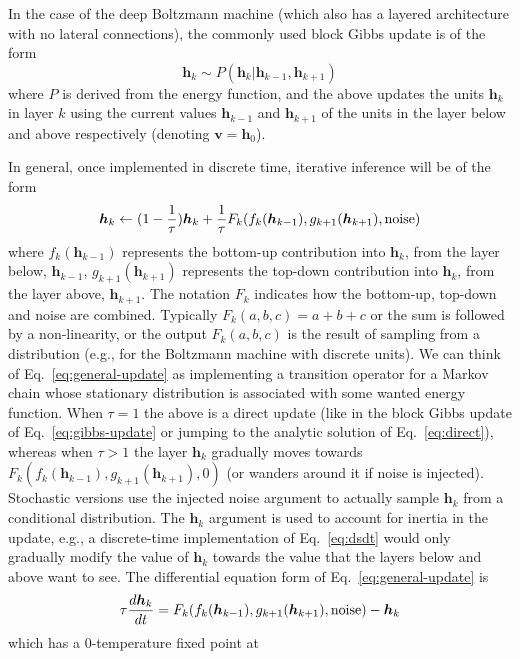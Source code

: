 \documentclass{article}
\newcommand   \vv{{\bm v}}
\newcommand   \vh{{\bm h}}
\begin{document}
In the case of the deep Boltzmann machine (which also has a layered architecture
with no lateral connections), the commonly used block Gibbs update is of the form
\begin{equation}
  \label{eq:gibbs-update}
  \vh_k \sim P(\vh_k | \vh_{k-1}, \vh_{k+1})
\end{equation}
where $P$ is derived from the energy function, and the above
updates the units $\vh_k$ in layer $k$ using the current values $\vh_{k-1}$ and $\vh_{k+1}$ of the
units in the layer below and above respectively (denoting $\vv=\vh_0$).

In general, once implemented in discrete time, iterative inference will be of the form
\begin{equation}
  \label{eq:general-update}
  \vh_k \leftarrow (1-\frac{1}{\tau}) \vh_k + \frac{1}{\tau} F_k(f_k(\vh_{k-1}),g_{k+1}(\vh_{k+1}),{\rm noise})
\end{equation}
where $f_k(\vh_{k-1})$ represents the bottom-up contribution into $\vh_k$, from the layer below, $\vh_{k-1}$,
$g_{k+1}(\vh_{k+1})$ represents the top-down contribution into $\vh_k$, from the layer above, $\vh_{k+1}$.
The notation $F_k$ indicates how the bottom-up, top-down and noise are combined. Typically $F_k(a,b,c)=a+b+c$
or the sum is followed by a non-linearity, or the output $F_k(a,b,c)$ is the result of sampling from a distribution
(e.g., for the Boltzmann machine with discrete units).
We can think of Eq.~\ref{eq:general-update} as implementing a transition operator for
a Markov chain whose stationary distribution is associated with some wanted energy function.
When $\tau=1$ the above is a direct update (like in the block Gibbs update of Eq.~\ref{eq:gibbs-update}
or jumping to the analytic solution of Eq.~\ref{eq:direct}), whereas when $\tau>1$ the layer $\vh_k$
gradually moves towards $F_k(f_k(\vh_{k-1}),g_{k+1}(\vh_{k+1}),0)$ (or wanders around it if noise is injected).
Stochastic versions use the injected noise argument to actually sample $\vh_k$ from a conditional
distribution. The $\vh_k$ argument is used to account for inertia in the update, e.g., a discrete-time
implementation of Eq.~\ref{eq:dsdt} would only gradually modify the value of $\vh_k$ towards the
value that the layers below and above want to see.
The differential equation form of Eq.~\ref{eq:general-update} is
\begin{equation}
  \label{eq:dhdt}
  \tau \frac{d\vh_k}{dt} = F_k(f_k(\vh_{k-1}),g_{k+1}(\vh_{k+1}),{\rm noise}) - \vh_k
\end{equation}
which has a 0-temperature fixed point at
\end{document}
